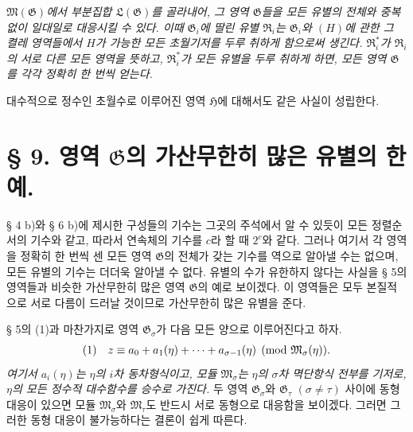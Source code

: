 \emph{$\mathfrak M(\mathfrak G)$에서 부분집합 $\mathfrak L(\mathfrak G)$를 골라내어, 그 영역 $\mathfrak G$들을 모든 유별의 전체와 중복 없이 일대일로 대응시킬 수 있다. 이때 $\mathfrak G_i$에 딸린 유별 $\mathfrak R_i$는 $\mathfrak G_i$와 $(H)$에 관한 그 켤레 영역들에서 $H$가 가능한 모든 초월기저를 두루 취하게 함으로써 생긴다. $\mathfrak R_i^*$가 $\mathfrak R_i$의 서로 다른 모든 영역을 뜻하고, $\mathfrak R_i^*$가 모든 유별을 두루 취하게 하면, 모든 영역 $\mathfrak G$를 각각 정확히 한 번씩 얻는다.}

대수적으로 정수인 초월수로 이루어진 영역 $\mathfrak H$에 대해서도 같은 사실이 성립한다.

\section*{§ 9. 영역 $\mathfrak G$의 가산무한히 많은 유별의 한 예.}

§ 4 b)와 § 6 b)에 제시한 구성들의 기수는 그곳의 주석에서 알 수 있듯이 모든 정렬순서의 기수와 같고, 따라서 연속체의 기수를 $c$라 할 때 $2^c$와 같다. 그러나 여기서 각 영역을 정확히 한 번씩 센 모든 영역 $\mathfrak G$의 전체가 갖는 기수를 역으로 알아낼 수는 없으며, 모든 유별의 기수는 더더욱 알아낼 수 없다. 유별의 수가 유한하지 않다는 사실을 § 5의 영역들과 비슷한 가산무한히 많은 영역 $\mathfrak G$의 예로 보이겠다. 이 영역들은 모두 본질적으로 서로 다름이 드러날 것이므로 가산무한히 많은 유별을 준다.

§ 5의 (1)과 마찬가지로 영역 $\mathfrak G_\sigma$가 다음 모든 양으로 이루어진다고 하자.
\[
\begin{array}{@{}l@{\quad}l@{}}
(1)& \displaystyle z\equiv a_0+a_1(\eta)+\cdots+a_{\sigma-1}(\eta)
 \pmod{\mathfrak M_\sigma(\eta)}.
\end{array}
\]
\emph{여기서 $a_i(\eta)$는 $\eta$의 $i$차 동차형식이고, 모듈 $\mathfrak M_\sigma$는 $\eta$의 $\sigma$차 멱단항식 전부를 기저로, $\eta$의 모든 정수적 대수함수를 승수로 가진다.} 두 영역 $\mathfrak G_\sigma$와 $\mathfrak G_\tau$ $(\sigma\ne\tau)$ 사이에 동형 대응이 있으면 모듈 $\mathfrak M_\sigma$와 $\mathfrak M_\tau$도 반드시 서로 동형으로 대응함을 보이겠다. 그러면 그러한 동형 대응이 불가능하다는 결론이 쉽게 따른다.

